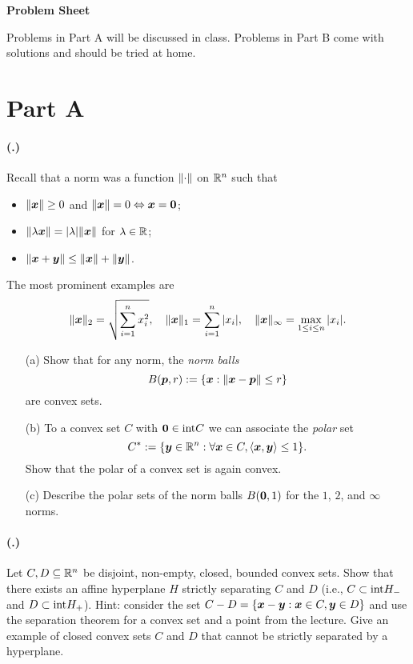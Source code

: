 \documentclass{article}
\newcounter{problemSheetNumber}
\newcounter{problems}
\renewcommand{\problem}{\paragraph{(\theproblemSheetNumber.\theproblems)}\addtocounter{problems}{1}}
\begin{document}
 
\begin{center}
{\Large {\bf Problem Sheet \theproblemSheetNumber}}
\end{center}

Problems in Part A will be discussed in class. Problems in Part B come with solutions and should be tried at home. 

\section*{Part A}

\problem Recall that a norm was a function $\Vert {\cdot}\Vert$ on $\mathbb{R}^n$ such that
\begin{itemize}
\item $\displaystyle \Vert {\bm{x}}\Vert\geq 0$ and $\Vert {\bm{x}}\Vert=0 \Leftrightarrow \bm{x}=\bm{0}$;
\item $\displaystyle \Vert {\lambda \bm{x}}\Vert = |\lambda|\Vert {\bm{x}}\Vert$ for $\lambda\in\mathbb{R}$;
\item $\displaystyle \Vert {\bm{x}+\bm{y}}\Vert \leq \Vert {\bm{x}}\Vert+\Vert {\bm{y}}\Vert$.
\end{itemize}
The most prominent examples are
\begin{equation*}
 \Vert {\bm{x}}\Vert_2 = \sqrt{\sum_{i=1}^n x_i^2}, \quad \Vert {\bm{x}}\Vert_1 = \sum_{i=1}^n |x_i|, \quad \Vert {\bm{x}}\Vert_\infty = \max_{1\leq i\leq n} |x_i|.
\end{equation*}
\begin{itemize}
 \item[(a)] Show that for any norm, the {\em norm balls}
 \begin{equation*}
  B(\bm{p},r) := \{\bm{x} \mathrel{\mathop{:}} \Vert {\bm{x}-\bm{p}}\Vert\leq r\}
 \end{equation*}
are convex sets. 
\item[(b)] To a convex set $C$ with $\bm{0}\in {\operatorname{int}} C$ we can associate the {\em polar} set
\begin{equation*}
 C^* := \{\bm{y}\in \mathbb{R}^n \mathrel{\mathop{:}} \forall \bm{x}\in C, \langle {\bm{x}}, {\bm{y}} \rangle\leq 1\}.
\end{equation*}
Show that the polar of a convex set is again convex.
\item[(c)] Describe the polar sets of the norm balls $B(\bm{0},1)$ for the $1$, $2$, and $\infty$ norms.
\end{itemize}

\problem Let $C,D\subseteq \mathbb{R}^n$ be disjoint, non-empty, closed, bounded convex sets. Show that there exists an affine hyperplane $H$ strictly separating $C$ and $D$ (i.e., $C\subset {\operatorname{int}} H_-$ and $D\subset {\operatorname{int}} H_+$). Hint: consider the set $C-D=\{\bm{x}-\bm{y}\mathrel{\mathop{:}} \bm{x}\in C, \bm{y}\in D\}$ and use the separation theorem for a convex set and a point from the lecture. Give an example of closed convex sets $C$ and $D$ that cannot be strictly separated by a hyperplane.
\end{document}
